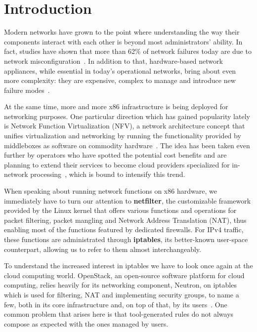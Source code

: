 \chapter{Introduction}



Modern networks have grown to the point where understanding the way their
components interact with each other is beyond most administrators' ability. In
fact, studies have shown that more than 62\% of network failures today are due
to network misconfiguration~\cite{alimi2008shadow}.  In addition to that,
hardware-based network appliances, while essential in today's operational
networks, bring about even more complexity: they are expensive, complex to
manage and introduce new failure modes~\cite{sherry2012making}.

At the same time, more and more x86 infrastructure is being deployed for
networking purposes. One particular direction which has gained popularity lately
is Network Function Virtualization (NFV), a network architecture concept that unifies virtualization and
networking by running the functionality provided by middleboxes as software on
commodity hardware~\cite{martins2014clickos, stoenescu2015net}. The idea has
been taken even further by operators who have spotted the potential cost
benefits and are planning to extend their services to become cloud providers
specialized for in-network processing~\cite{stoenescu2015net}, which is bound
to intensify this trend.

When speaking about running network functions on x86 hardware, we immediately
have to turn our attention to \textbf{netfilter}, the customizable framework
provided by the Linux kernel that offers various functions and operations for
packet filtering, packet mangling and Network Address Translation
(NAT), thus enabling most of the
functions featured by dedicated firewalls. For IPv4 traffic, these functions
are administrated through \textbf{iptables}, its better-known user-space
counterpart, allowing us to refer to them almost interchangeably.

To understand the increased interest in iptables we have to look once again at
the cloud computing world.  OpenStack, an open-source software platform for
cloud computing, relies heavily for its networking component, Neutron, on
iptables which is used for filtering, NAT and implementing security groups, to
name a few, both in its core infrastructure and, on top of that, by its
users~\cite{denton2014learning}.  One common problem that arises here is that
tool-generated rules do not always compose as expected with the ones managed by
users.

